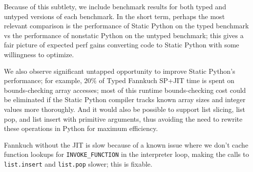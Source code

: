 \documentclass[english,cleveref,submission]{programming}
\newcommand{\code}[1]{\texttt{#1}}
\begin{document}
Because of this subtlety, we include benchmark results for both typed and
untyped versions of each benchmark. In the short term, perhaps the most
relevant comparison is the performance of Static Python on the typed benchmark
vs the performance of nonstatic Python on the untyped benchmark; this gives a
fair picture of expected perf gains converting code to Static Python with some
willingness to optimize.

We also observe significant untapped opportunity to improve Static Python's
performance; for example, $20\%$ of Typed Fannkuch SP+JIT time is spent on
bounds-checking array accesses; most of this runtime bounds-checking cost could
be eliminated if the Static Python compiler tracks known array sizes and
integer values more thoroughly. And it would also be possible to support list
slicing, list pop, and list insert with primitive arguments, thus avoiding the
need to rewrite these operations in Python for maximum efficiency.

 Fannkuch without the JIT is slow because of a known issue where we
don't cache function lookups for \code{INVOKE\_FUNCTION} in the interpreter loop,
making the calls to \code{list.insert} and \code{list.pop} slower; this is fixable.
\end{document}
